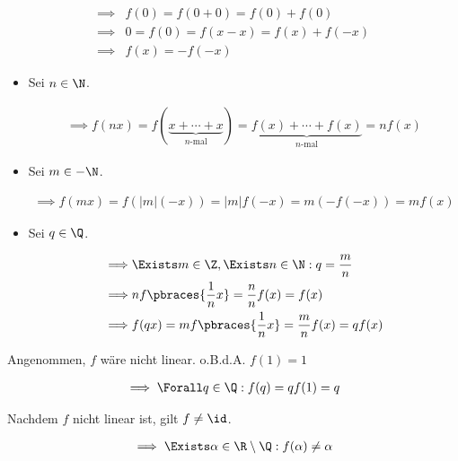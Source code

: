 \begin{solution}

\begin{align*}
    \implies &
    f(0) = f(0 + 0) = f(0) + f(0) \\
    \implies &
    0 = f(0) = f(x - x) = f(x) + f(-x) \\
    \implies &
    f(x) = -f(-x)
\end{align*}

\begin{itemize}
    \item Sei $n \in \N$.
    
    \begin{align*}
        \implies
        f(n x)
        =
        f(\underbrace{x + \cdots + x}_{\displaystyle \text{$n$-mal}})
        =
        \underbrace{f(x) + \cdots + f(x)}_{\displaystyle \text{$n$-mal}}
        =
        n f(x)
    \end{align*}

    \item Sei $m \in -\N$.
    
    \begin{align*}
        \implies
        f(m x)
        =
        f(|m| (-x))
        =
        |m| f(-x)
        =
        m (-f(-x))
        =
        m f(x)
    \end{align*}

    \item Sei $q \in \Q$.
    
    \begin{align*}
        \implies &
        \Exists m \in \Z, \Exists n \in \N:
            q = \frac{m}{n} \\
        \implies &
        n f \pbraces{\frac{1}{n} x} = \frac{n}{n} f(x) = f(x) \\
        \implies &
        f(q x)
        =
        m f \pbraces{\frac{1}{n} x}
        =
        \frac{m}{n} f(x)
        =
        q f(x)
    \end{align*}

\end{itemize}

Angenommen, $f$ wäre nicht linear.
o.B.d.A. $f(1) = 1$

\begin{align*}
    \implies
    \Forall q \in \Q:
        f(q) = q f(1) = q
\end{align*}

Nachdem $f$ nicht linear ist, gilt $f \neq \id$.

\begin{align*}
    \implies
    \Exists \alpha \in \R \setminus \Q:
        f(\alpha) \neq \alpha
\end{align*}


\end{solution}
